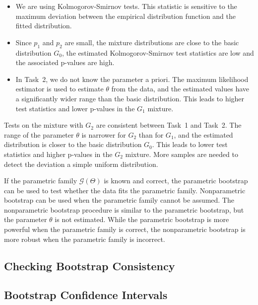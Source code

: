 \documentclass{article}
\begin{document}
\begin{itemize}
    \item We are using Kolmogorov-Smirnov tests. This statistic is sensitive to the maximum deviation between the empirical distribution function and the fitted distribution.
    \item Since \(p_1\) and \(p_2\) are small, the mixture distributions are close to the basic distribution \(G_0\), the estimated Kolmogorov-Smirnov test statistics are low and the associated p-values are high.
    \item In Task~2, we do not know the parameter a priori. The maximum likelihood estimator is used to estimate \(\theta\) from the data, and the estimated values have a significantly wider range than the basic distribution. This leads to higher test statistics and lower p-values in the \(G_1\) mixture.
\end{itemize}

Tests on the mixture with \(G_2\) are consistent between Task~1 and Task~2. The range of the parameter \(\theta\) is narrower for \(G_2\) than for \(G_1\), and the estimated distribution is closer to the basic distribution \(G_0\). This leads to lower test statistics and higher p-values in the \(G_2\) mixture. More samples are needed to detect the deviation a simple uniform distribution.

If the parametric family \(\mathcal{G}(\Theta)\) is known and correct, the parametric bootstrap can be used to test whether the data fits the parametric family. Nonparametric bootstrap can be used when the parametric family cannot be assumed. The nonparametric bootstrap procedure is similar to the parametric bootstrap, but the parameter \(\theta\) is not estimated. While the parametric bootstrap is more powerful when the parametric family is correct, the nonparametric bootstrap is more robust when the parametric family is incorrect.

\subsection{Checking Bootstrap Consistency}

\subsection{Bootstrap Confidence Intervals}
\end{document}
